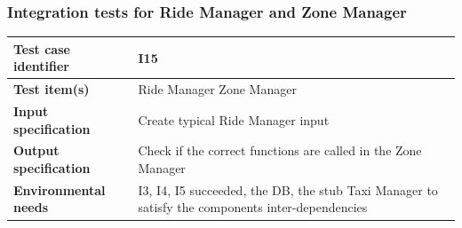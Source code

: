 \documentclass[a4paper,11pt]{report} %
\begin{document}
		\subsubsection{Integration tests for Ride Manager and Zone Manager} \label{sec:3.1.12}
			\begin{minipage}{\linewidth}
			\end{minipage}		
		\begin{center}
			\renewcommand{\arraystretch}{1.2}
			\setlength{\tabcolsep}{24pt}
			\begin{tabular}{ l  p{9cm}}\hline
				\textbf{Test case identifier} & I15\\\hline
				\textbf{Test item(s)} & Ride Manager \textrightarrow Zone Manager\\\hline
				\textbf{Input specification} & Create typical Ride Manager input \\\hline
				\textbf{Output specification} & Check if the correct functions are called in the Zone Manager\\\hline
				\textbf{Environmental needs} & I3, I4, I5 succeeded, the DB, the stub Taxi Manager to satisfy the components inter-dependencies\\\hline
			\end{tabular}
		\end{center}	
		
		\bigskip  
\end{document}
